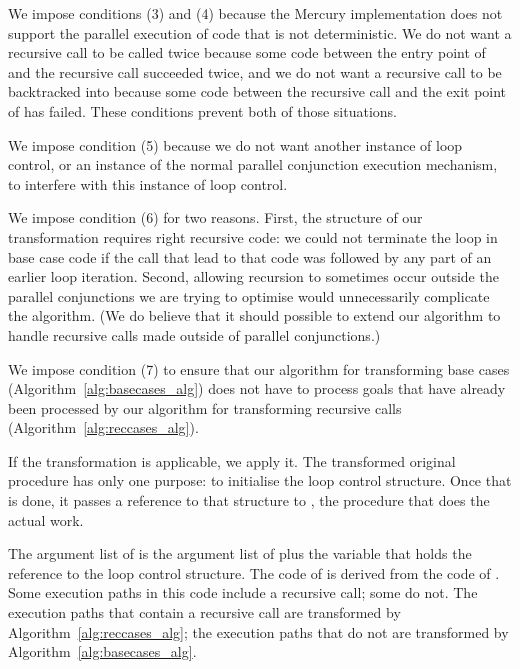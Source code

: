 We impose conditions (3) and (4) because the Mercury implementation
does not support the parallel execution of code that is not deterministic.
We do not want a recursive call to be called twice because
some code between the entry point of  and the recursive call
succeeded twice,
and we do not want a recursive call to be backtracked into because
some code between the recursive call and the exit point of 
has failed.
These conditions prevent both of those situations.

We impose condition (5) because we do not want another instance of loop control,
or an instance of the normal parallel conjunction execution mechanism,
to interfere with this instance of loop control.

We impose condition (6) for two reasons.
First, the structure of our transformation requires right recursive code:
we could not terminate the loop in base case code
if the call that lead to that code
was followed by any part of an earlier loop iteration.
Second, allowing recursion to sometimes occur
outside the parallel conjunctions we are trying to optimise
would unnecessarily complicate the algorithm.
(We do believe that it should possible to extend our algorithm
to handle recursive calls made outside of parallel conjunctions.)


We impose condition (7) to ensure that
our algorithm for transforming base cases
(Algorithm~\ref{alg:basecases_alg})
does not have to process goals that have already been processed
by our algorithm for transforming recursive calls
(Algorithm~\ref{alg:reccases_alg}).

If the transformation is applicable, we apply it.
The transformed original procedure has only one purpose:
to initialise the loop control structure.
Once that is done, it passes a reference to that structure to ,
the procedure that does the actual work.

The argument list of 
is the argument list of 
plus the \LC variable that holds the reference to the loop control structure.
The code of  is derived from the code of .
Some execution paths in this code include a recursive call; some do not.
The execution paths that contain a recursive call
are transformed by Algorithm~\ref{alg:reccases_alg};
the execution paths that do not
are transformed by Algorithm~\ref{alg:basecases_alg}.


